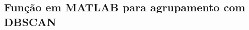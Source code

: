 	\begin{anexosenv}
	\partanexos
\chapter{Função em MATLAB para agrupamento com DBSCAN \cite{Thanh2013}}
\label{ap:dbscan}

\end{anexosenv}


